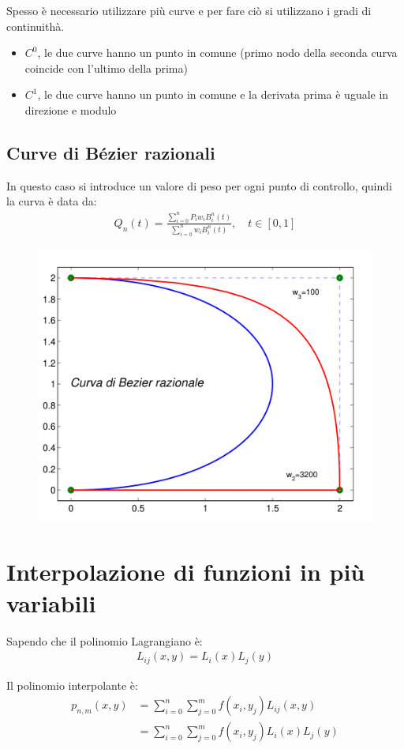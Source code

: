 Spesso \`e necessario utilizzare pi\`u curve e per fare ci\`o si utilizzano i gradi di continuith\`a.

\begin{itemize}
  \item $C^0$, le due curve hanno un punto in comune (primo nodo della seconda curva coincide con l'ultimo della prima)
  \item $C^1$, le due curve hanno un punto in comune e la derivata prima \`e uguale in direzione e modulo
\end{itemize}

\subsection{Curve di B\'ezier razionali}

In questo caso si introduce un valore di peso per ogni punto di controllo, quindi la curva \`e data da:
\begin{align}
  Q_n(t) = \frac{\sum_{i=0}^n P_i w_i B_i^n(t)}{\sum_{i=0}^n w_i B_i^n(t)}, \quad t \in [0, 1]
\end{align}


\begin{figure}[h!]
  \centering
  \includegraphics[width=0.4\linewidth]{images/bazier_pesato_esempio.png}
\end{figure}



\section{Interpolazione di funzioni in pi\`u variabili}
Sapendo che il polinomio Lagrangiano \`e:
\begin{align}
  L_{ij}(x, y) = L_i(x) L_j(y)
\end{align}

Il polinomio interpolante \`e:
\begin{align}
  p_{n, m}(x, y) &= \sum_{i=0}^n \sum_{j=0}^m f(x_i, y_j) L_{ij}(x, y) \\
  &= \sum_{i=0}^n \sum_{j=0}^m f(x_i, y_j) L_i(x) L_j(y)
\end{align}
